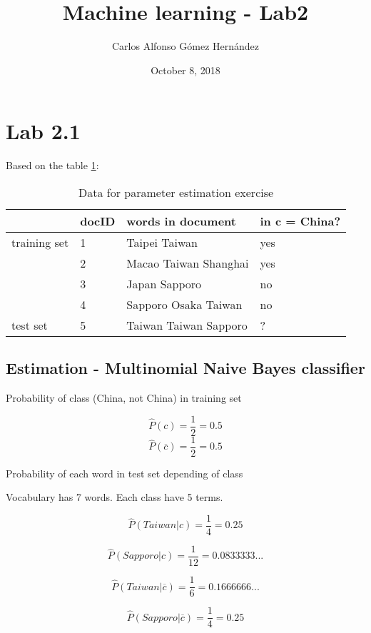 \documentclass{article}
\title{Machine learning - Lab2}
\author{Carlos Alfonso Gómez Hernández}
\date{October 8, 2018}
\begin{document}
\maketitle

\section{Lab 2.1}

{Based on the table \ref{table:13.10}: }

\begin{table}[h]
\begin{center}
\begin{tabular}{@{}llll@{}}
	\hline
             & docID & words in document     & in c = China? \\ \hline
training set & 1     & Taipei Taiwan         & yes           \\
             & 2     & Macao Taiwan Shanghai & yes           \\
             & 3     & Japan Sapporo         & no            \\
             & 4     & Sapporo Osaka Taiwan  & no            \\
test set     & 5     & Taiwan Taiwan Sapporo & ?             \\
\hline
\end{tabular}
\caption{Data for parameter estimation exercise}
\label{table:13.10}
\end{center}
\end{table}

\subsection{Estimation - Multinomial Naive Bayes classifier}

Probability of class (China, not China) in training set

$$\hat{P}(c) = \frac{1}{2} = 0.5$$
$$\hat{P}(\overline{c}) = \frac{1}{2} = 0.5$$

Probability of each word in test set depending of class

Vocabulary has 7 words. Each class have 5 terms.

\[\hat{P}(Taiwan|c) = \frac{1}{4} = 0.25\]

\[\hat{P}(Sapporo|c) = \frac{1}{12} = 0.0833333...\]

\[\hat{P}(Taiwan|\overline{c}) = \frac{1}{6} = 0.1666666...\]

\[\hat{P}(Sapporo|\overline{c})  = \frac{1}{4} = 0.25\]
\end{document}
